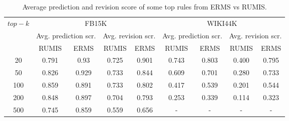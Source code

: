 \begin{table}[t]
\centering
\begin{tabular}{|c|c c|c c|c c|c c|}
 \hline
 \multirow{3}{*}{$top-k$}&\multicolumn{4}{|c|}{FB15K} & \multicolumn{4}{|c|}{WIKI44K}\\
 \cline{2-9}&\multicolumn{2}{|c|}{Avg. prediction scr.}&\multicolumn{2}{|c|}{Avg. revision scr.}&\multicolumn{2}{|c|}{Avg. prediction scr.}&\multicolumn{2}{|c|}{Avg. revision scr.} \\
 \cline{2-9} & RUMIS & ERMS & RUMIS & ERMS & RUMIS & ERMS & RUMIS & ERMS \\
 \hline
20 & 0.791 & 0.93 & 0.725 & 0.901 & 0.743 & 0.803 & 0.400 & 0.795 \\
50 & 0.826 & 0.929 & 0.733 & 0.844 & 0.609 & 0.701 & 0.280 & 0.733 \\
100 & 0.859 & 0.891 & 0.733 & 0.802 & 0.417 & 0.539 & 0.201 & 0.544\\
200 & 0.848 & 0.897 & 0.704 & 0.793 & 0.253 & 0.339 & 0.114 & 0.323\\
500 & 0.745 & 0.859 & 0.559 & 0.656 & - & - & - & - \\
\hline
\end{tabular}
\caption{Average prediction and revision score of some top rules from ERMS vs RUMIS.}
\label{table:exception_result}
\end{table}
